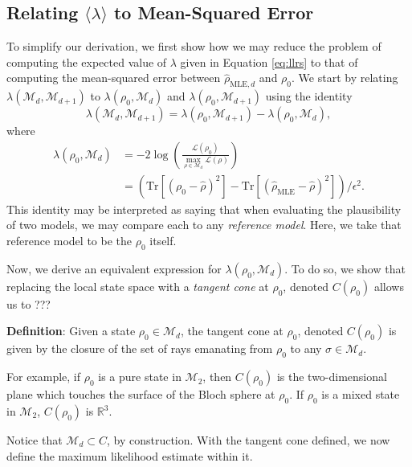 \documentclass[aps,pra, twocolumn]{revtex4-1}
\newcommand{\M}{\mathcal{M}}
\newcommand{\rhohat}{\hat{\rho}}
\newcommand{\rhoMLE}{\rhohat_{\scriptscriptstyle\mathrm{MLE}}}
\begin{document}
\subsection{Relating $\langle \lambda \rangle$ to Mean-Squared Error}

To simplify our derivation, we first show how we may reduce the problem of computing the expected value of $\lambda$ given in Equation \eqref{eq:llrs} to that of computing the mean-squared error between $\hat{\rho}_{\mathrm{MLE},d}$ and $\rho_{0}$. We start by relating $\lambda(\M_{d},\M_{d+1})$ to $\lambda(\rho_{0}, \M_{d})$ and $\lambda(\rho_{0}, \M_{d+1})$ using the identity
\begin{equation}
\lambda(\mathcal{M}_{d}, \mathcal{M}_{d + 1}) = \lambda(\rho_{0}, \mathcal{M}_{d+1}) - \lambda(\rho_{0}, \mathcal{M}_{d}),
\end{equation}
where
\begin{align}
\nonumber\lambda(\rho_{0}, \mathcal{M}_{d}) &= -2 \log \left(\frac{\mathcal{L}(\rho_{0})}{\underset{\rho \in \mathcal{M}_{d}}{\max}
\mathcal{L}(\rho)}\right)\\
& = (\mathrm{Tr}[(\rho_{0} - \hat{\rho})^{2}]- \mathrm{Tr}[(\rhoMLE - \hat{\rho})^{2}])/\epsilon^{2}.
\end{align}
This identity may be interpreted as saying that when evaluating the plausibility of two models, we may compare each to any \emph{reference model}. Here, we take that reference model to be the $\rho_{0}$ itself.

Now, we derive an equivalent expression for $\lambda(\rho_{0}, \M_{d})$. To do so, we show that replacing the local state space with a \emph{tangent cone} at $\rho_{0}$, denoted $C(\rho_{0})$ allows us to ???


\textbf{Definition}: Given a state $\rho_{0}\in \M_{d}$, the tangent cone at $\rho_{0}$, denoted $C(\rho_{0})$ is given by the closure of the set of rays emanating from $\rho_{0}$ to any $\sigma \in \M_{d}$.

For example, if $\rho_{0}$ is a pure state in $\M_{2}$, then $C(\rho_{0})$ is the two-dimensional plane which touches the surface of the Bloch sphere at $\rho_{0}$. If $\rho_{0}$ is a mixed state in $\M_{2}$, $C(\rho_{0})$ is $\mathbb{R}^{3}$.

Notice that $\M_{d} \subset C$, by construction. With the tangent cone defined, we now define the maximum likelihood estimate within it.
\end{document}

